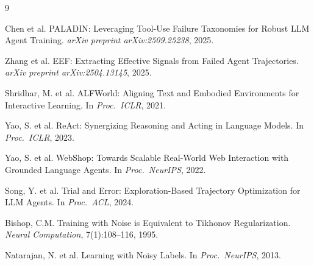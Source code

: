 \documentclass[11pt,a4paper]{article}
\begin{document}
\begin{thebibliography}{9}

Chen et al.
\newblock PALADIN: Leveraging Tool-Use Failure Taxonomies for Robust LLM Agent Training.
\newblock \emph{arXiv preprint arXiv:2509.25238}, 2025.

Zhang et al.
\newblock EEF: Extracting Effective Signals from Failed Agent Trajectories.
\newblock \emph{arXiv preprint arXiv:2504.13145}, 2025.

Shridhar, M. et al.
\newblock ALFWorld: Aligning Text and Embodied Environments for Interactive Learning.
\newblock In \emph{Proc.\ ICLR}, 2021.

Yao, S. et al.
\newblock ReAct: Synergizing Reasoning and Acting in Language Models.
\newblock In \emph{Proc.\ ICLR}, 2023.

Yao, S. et al.
\newblock WebShop: Towards Scalable Real-World Web Interaction with Grounded Language Agents.
\newblock In \emph{Proc.\ NeurIPS}, 2022.

Song, Y. et al.
\newblock Trial and Error: Exploration-Based Trajectory Optimization for LLM Agents.
\newblock In \emph{Proc.\ ACL}, 2024.

Bishop, C.M.
\newblock Training with Noise is Equivalent to Tikhonov Regularization.
\newblock \emph{Neural Computation}, 7(1):108--116, 1995.

Natarajan, N. et al.
\newblock Learning with Noisy Labels.
\newblock In \emph{Proc.\ NeurIPS}, 2013.

\end{thebibliography}
\end{document}
